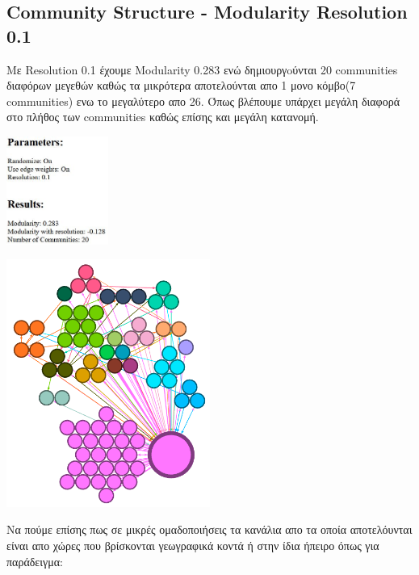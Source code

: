 \documentclass[12pt]{article}
\begin{document}
	\subsection{Community Structure - Modularity Resolution 0.1}
	Με Resolution 0.1 έχουμε Modularity 0.283 ενώ δημιουργoύνται 20 communities διαφόρων μεγεθών καθώς τα μικρότερα αποτελούνται απο 1 μονο κόμβο(7 communities) ενω το μεγαλύτερο απο 26. Όπως βλέπουμε υπάρχει μεγάλη διαφορά στο πλήθος των communities καθώς επίσης και μεγάλη κατανομή.
	\vspace{12pt}
	\begin{center}
		\begin{adjustbox}{valign=t}
			\includegraphics[width=0.25\textwidth]{photos-files/section12/0.1/report.JPG}
		\end{adjustbox}
		\hfill
		\begin{adjustbox}{valign=t}
			\includegraphics[width=0.5\textwidth]{photos-files/section12/0.1/no_label_layout.png}
		\end{adjustbox}
	\end{center}
	
	Να πούμε επίσης πως σε μικρές ομαδοποιήσεις τα κανάλια απο τα οποία αποτελόυνται είναι απο χώρες που βρίσκονται γεωγραφικά κοντά ή στην ίδια ήπειρο όπως για παράδειγμα:
	
\end{document}
